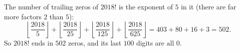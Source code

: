 The number of trailing zeros of $2018!$ is the exponent of $5$ in it (there are far more factors $2$ than $5$):
\[
\left\lfloor\dfrac{2018}{5}\right\rfloor+\left\lfloor\dfrac{2018}{25}\right\rfloor+\left\lfloor\dfrac{2018}{125}\right\rfloor+\left\lfloor\dfrac{2018}{625}\right\rfloor=403+80+16+3=502 .
\]
So $2018!$ ends in $502$ zeros, and its last $100$ digits are $\boxed{\text{all }0}$.
